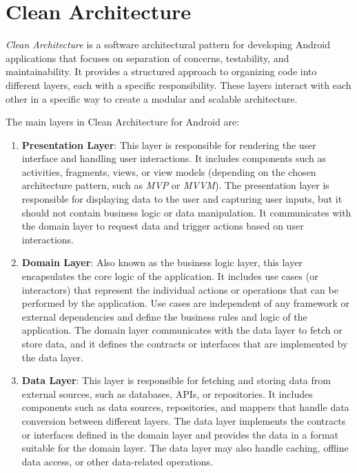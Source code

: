 \documentclass[a4paper, 12pt]{article}
\begin{document}

\section{Clean Architecture}

\textit{Clean Architecture} is a software architectural pattern for developing Android applications that focuses on separation of concerns, testability, and maintainability. 
It provides a structured approach to organizing code into different layers, each with a specific responsibility. 
These layers interact with each other in a specific way to create a modular and scalable architecture.

The main layers in Clean Architecture for Android are:

\begin{enumerate}
    \item \textbf{Presentation Layer}: This layer is responsible for rendering the user interface and handling user interactions. 
    It includes components such as activities, fragments, views, or view models (depending on the chosen architecture pattern, such as \textit{MVP} or \textit{MVVM}). 
    The presentation layer is responsible for displaying data to the user and capturing user inputs, but it should not contain business logic or data manipulation.
     It communicates with the domain layer to request data and trigger actions based on user interactions.

    \item \textbf{Domain Layer}: Also known as the business logic layer, this layer encapsulates the core logic of the application. 
    It includes use cases (or interactors) that represent the individual actions or operations that can be performed by the application. 
    Use cases are independent of any framework or external dependencies and define the business rules and logic of the application. 
    The domain layer communicates with the data layer to fetch or store data, and it defines the contracts or interfaces that are implemented by the data layer.
    
    \item \textbf{Data Layer}: This layer is responsible for fetching and storing data from external sources, such as databases, APIs, or repositories.
     It includes components such as data sources, repositories, and mappers that handle data conversion between different layers. 
     The data layer implements the contracts or interfaces defined in the domain layer and provides the data in a format suitable for the domain layer. 
     The data layer may also handle caching, offline data access, or other data-related operations.
    
\end{enumerate}
\end{document}
